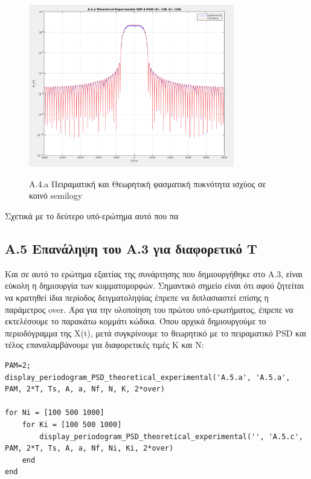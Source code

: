 \documentclass[11pt]{article}
\begin{document}
      \begin{figure}[H]
        \centering
        \includegraphics[scale=0.5, width=0.8\textwidth]{photos/A.4.a SDP 4-PAM_K-100_N-100.png} \\
        \caption{A.4.a Πειραματική και Θεωρητική φασματική πυκνότητα ισχύος σε κοινό semilogy}
    \end{figure}
    
    
    \par \noindent
    Σχετικά με το δεύτερο υπό-ερώτημα αυτό που πα
    
    
    
    \subsection*{A.5 Επανάληψη του Α.3 για διαφορετικό T}
    Και σε αυτό το ερώτημα εξαιτίας της συνάρτησης που δημιουργήθηκε στο Α.3, είναι εύκολη η δημιουργία των κυμματομορφών.
    Σημαντικό σημείο είναι ότι αφού ζητείται να κρατηθεί ίδια περίοδος δειγματοληψίας έπρεπε να διπλασιαστεί επίσης η παράμετρος over. 
    Άρα για την υλοποίηση του πρώτου υπό-ερωτήματος, έπρεπε να εκτελέσουμε το παρακάτω κομμάτι κώδικα. Όπου αρχικά δημιουργούμε το περιοδόγραμμα της X(t), μετά συγκρίνουμε το θεωρητικό με το πειραματικό PSD και τέλος επαναλαμβάνουμε για διαφορετικές τιμές Κ και Ν:
    
    \begin{lstlisting}[caption = {A.5 Επανάληψη του Α.3 για διαφορετικό T}]
PAM=2;
display_periodogram_PSD_theoretical_experimental('A.5.a', 'A.5.a', PAM, 2*T, Ts, A, a, Nf, N, K, 2*over)

for Ni = [100 500 1000]
    for Ki = [100 500 1000]
        display_periodogram_PSD_theoretical_experimental('', 'A.5.c', PAM, 2*T, Ts, A, a, Nf, Ni, Ki, 2*over)
    end
end
    \end{lstlisting}
    
\end{document}
